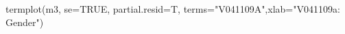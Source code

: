 \begin{Schunk}
\begin{Sinput}
 termplot(m3, se=TRUE, partial.resid=T, terms="V041109A",xlab="V041109a: Gender")
\end{Sinput}
\end{Schunk}
